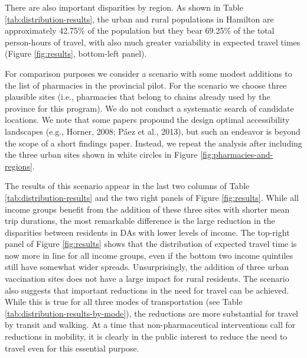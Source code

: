 \documentclass[]{elsarticle} %
\begin{document}
There are also important disparities by region. As shown in Table
\ref{tab:distribution-results}, the urban and rural populations in
Hamilton are approximately 42.75\% of the population but they bear
69.25\% of the total person-hours of travel, with also much greater
variability in expected travel times (Figure \ref{fig:results},
bottom-left panel).

For comparison purposes we consider a scenario with some modest
additions to the list of pharmacies in the provincial pilot. For the
scenario we choose three plausible sites (i.e., pharmacies that belong
to chains already used by the province for this program). We do not
conduct a systematic search of candidate locations. We note that some
papers propound the design optimal accessibility landscapes (e.g.,
Horner, 2008; Páez et al., 2013), but such an endeavor is beyond the
scope of a short findings paper. Instead, we repeat the analysis after
including the three urban sites shown in white circles in Figure
\ref{fig:pharmacies-and-regions}.

The results of this scenario appear in the last two columns of Table
\ref{tab:distribution-results} and the two right panels of Figure
\ref{fig:results}. While all income groups benefit from the addition of
these three sites with shorter mean trip durations, the most remarkable
difference is the large reduction in the disparities between residents
in DAs with lower levels of income. The top-right panel of Figure
\ref{fig:results} shows that the distribution of expected travel time is
now more in line for all income groups, even if the bottom two income
quintiles still have somewhat wider spreads. Unsurprisingly, the
addition of three urban vaccination sites does not have a large impact
for rural residents. The scenario also suggests that important
reductions in the need for travel can be achieved. While this is true
for all three modes of transportation (see Table
\ref{tab:distribution-results-by-mode}), the reductions are more
substantial for travel by transit and walking. At a time that
non-pharmaceutical interventions call for reductions in mobility, it is
clearly in the public interest to reduce the need to travel even for
this essential purpose.
\end{document}
